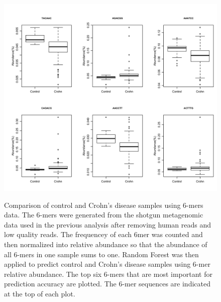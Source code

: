 \begin{figure}[p]
	\centering
	{\includegraphics[scale=0.28,trim=40 0 0 0,clip]{Figure/F55_Kmer_Difference.png}
	}
	\caption[Comparison of control and Crohn's disease samples using 6-mers data]{Comparison of control and Crohn's disease samples  using 6-mers data.  The 6-mers were generated from the shotgun metagenomic data used in the previous analysis after removing human reads and low quality reads. The  frequencey of each 6mer was counted and then normalized into relative abundance so that the abundance of all 6-mers in one sample sums to one. Random Forest was then applied to predict control and Crohn's disease samples using 6-mer relative abundance. The top six 6-mers that are most important for  prediction accuracy are plotted. The 6-mer sequences are indicated at the top of each plot.
	}
	\label{F55_Kmer_Difference}
\end{figure}





